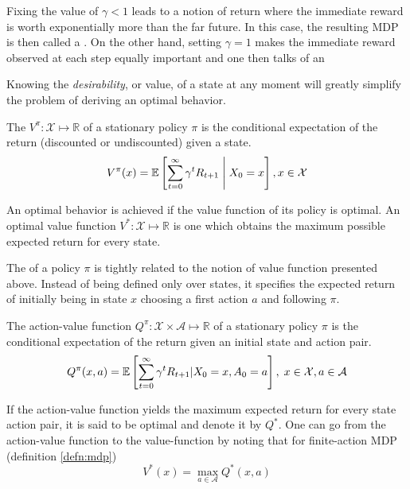 Fixing the value of $\gamma < 1$ leads to a notion of return where the immediate
reward is worth exponentially more than the far future. In this case, the resulting MDP 
is then called a . On the other hand, setting $\gamma =
1$ makes the immediate reward observed at each step equally important and one 
then talks of an 

Knowing the \textit{desirability}, or value, of a state at any moment will greatly
simplify the problem of deriving an optimal behavior. 

\begin{defn}
The  $V^\pi: \mathcal{X} \mapsto \mathbb{R}$ of a
stationary policy $\pi$ is the conditional expectation of the return (discounted or
undiscounted) given a state.
\begin{equation} 
V^\pi(x) = \operatorname{\mathbb{E}} \left[ \sum_{t=0}^\infty \gamma^t R_{t+1}  \;\middle\vert\;  X_0 =
x\right] , x \in \mathcal{X} \label{eq:value-function}
\end{equation}
\end{defn}

An optimal behavior is achieved if the value function of its policy is optimal. An
optimal value function $V^*: \mathcal{X} \mapsto \mathbb{R}$ is one which obtains
the maximum possible expected return for every state.

The  of a policy $\pi$ is tightly related to the notion of
value function presented above. Instead of being defined only over states, it specifies
the expected return of initially being in state $x$ choosing a first action $a$ and
following $\pi$. 
\begin{defn}
The action-value function $Q^\pi: \mathcal{X} \times \mathcal{A} \mapsto
\mathbb{R}$ of a stationary policy $\pi$ is the conditional expectation of the return
given an initial state and action pair. 
\begin{equation}
Q^\pi(x, a) = \operatorname{\mathbb{E}} \left[ \sum_{t=0}^\infty \gamma^t R_{t+1} \vert X_0 = x,
A_0 = a \right], \; x \in \mathcal{X}, a \in \mathcal{A}
\end{equation}
\end{defn}

If the action-value function yields the maximum expected return for every state
action pair, it is said to be optimal and denote it by $Q^*$. One can go from the
action-value function to the value-function by noting that for finite-action MDP
(definition \ref{defn:mdp})
\begin{equation}
V^*(x) = \max_{a \in \mathcal{A}} Q^*(x, a) \label{eq:qopt-to-vopt}
\end{equation}


